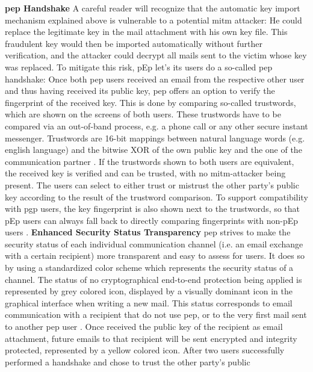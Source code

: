 \newline
\newline
\textbf{\acrshort{pep} Handshake}\newline
A careful reader will recognize that the automatic key import mechanism explained above is vulnerable to a potential \acrfull{mitm} attacker: He could replace the legitimate key in the mail attachment with his own key file. This fraudulent key would then be imported automatically without further verification, and the attacker could decrypt all mails sent to the victim whose key was replaced.
\newline
To mitigate this risk, pEp let's its users do a so-called \acrshort{pep} handshake: Once both \acrshort{pep} users received an email from the respective other user and thus having received its public key, \acrshort{pep} offers an option to verify the fingerprint of the received key. This is done by comparing so-called trustwords, which are shown on the screens of both users. These trustwords have to be compared via an out-of-band process, e.g. a phone call or any other secure instant messenger. Trustwords are 16-bit mappings between natural language words (e.g. english language) and the bitwise XOR of the own public key and the one of the communication partner \cite{17}. If the trustwords shown to both users are equivalent, the received key is verified and can be trusted, with no \acrshort{mitm}-attacker being present. The users can select to either trust or mistrust the other party's public key according to the result of the trustword
comparison. To support compatibility with \acrshort{pgp} users, the key fingerprint is also shown next to the trustwords, so that pEp users can always fall back to directly comparing fingerprints with non-pEp users \cite{19}.
\newline
\newline
\textbf{Enhanced Security Status Transparency}\newline
\acrshort{pep} strives to make the security status of each individual communication channel (i.e. an email exchange with a certain recipient) more transparent and easy to assess for users. It does so by using a standardized color scheme which represents the security status of a channel. The status of no cryptographical end-to-end protection being applied is represented by grey colored icon, displayed by a visually dominant icon in the graphical interface when writing a new mail. This status corresponds to email communication with a recipient that do not use \acrshort{pep}, or to the very first mail sent to another \acrshort{pep} user \cite{15}. Once received the public key of the recipient as \acrshort{email} attachment, future \acrshort{email}s to that recipient will be sent encrypted and integrity protected, represented by a yellow colored icon. After two users successfully performed a handshake and chose to trust the other party's public
